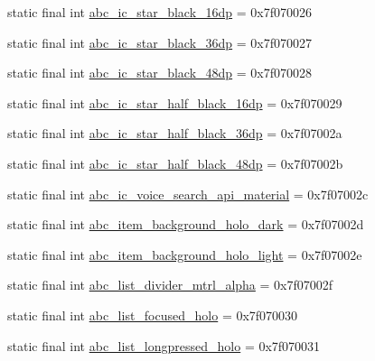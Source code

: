 \begin{DoxyCompactItemize}
\item 
static final int \mbox{\hyperlink{classandroid_1_1support_1_1design_1_1_r_1_1drawable_a1349833a92af4cf33ba5ba40922424cd}{abc\+\_\+ic\+\_\+star\+\_\+black\+\_\+16dp}} = 0x7f070026
\item 
static final int \mbox{\hyperlink{classandroid_1_1support_1_1design_1_1_r_1_1drawable_a53c64840aafc7cb905a77e8ae43146fa}{abc\+\_\+ic\+\_\+star\+\_\+black\+\_\+36dp}} = 0x7f070027
\item 
static final int \mbox{\hyperlink{classandroid_1_1support_1_1design_1_1_r_1_1drawable_ad675e83333ff2144c1caf279418c8c36}{abc\+\_\+ic\+\_\+star\+\_\+black\+\_\+48dp}} = 0x7f070028
\item 
static final int \mbox{\hyperlink{classandroid_1_1support_1_1design_1_1_r_1_1drawable_a93bca0ef4c914b420f16b575f153cb9f}{abc\+\_\+ic\+\_\+star\+\_\+half\+\_\+black\+\_\+16dp}} = 0x7f070029
\item 
static final int \mbox{\hyperlink{classandroid_1_1support_1_1design_1_1_r_1_1drawable_a7d30855bcf34cff38d00c8dda284eef5}{abc\+\_\+ic\+\_\+star\+\_\+half\+\_\+black\+\_\+36dp}} = 0x7f07002a
\item 
static final int \mbox{\hyperlink{classandroid_1_1support_1_1design_1_1_r_1_1drawable_a3c43eadf8e065ab4783200e4657248d3}{abc\+\_\+ic\+\_\+star\+\_\+half\+\_\+black\+\_\+48dp}} = 0x7f07002b
\item 
static final int \mbox{\hyperlink{classandroid_1_1support_1_1design_1_1_r_1_1drawable_aa07112ae69ed5850fa0c44fa53e619f1}{abc\+\_\+ic\+\_\+voice\+\_\+search\+\_\+api\+\_\+material}} = 0x7f07002c
\item 
static final int \mbox{\hyperlink{classandroid_1_1support_1_1design_1_1_r_1_1drawable_a7b733f9057a2cff89be485f9cd6928d5}{abc\+\_\+item\+\_\+background\+\_\+holo\+\_\+dark}} = 0x7f07002d
\item 
static final int \mbox{\hyperlink{classandroid_1_1support_1_1design_1_1_r_1_1drawable_a43f7ea0b127c030b4e1a667243515c79}{abc\+\_\+item\+\_\+background\+\_\+holo\+\_\+light}} = 0x7f07002e
\item 
static final int \mbox{\hyperlink{classandroid_1_1support_1_1design_1_1_r_1_1drawable_abb445bd8a123081407a9b597f769ad61}{abc\+\_\+list\+\_\+divider\+\_\+mtrl\+\_\+alpha}} = 0x7f07002f
\item 
static final int \mbox{\hyperlink{classandroid_1_1support_1_1design_1_1_r_1_1drawable_a1d26c3d76e535036aa21aa917a88cb4e}{abc\+\_\+list\+\_\+focused\+\_\+holo}} = 0x7f070030
\item 
static final int \mbox{\hyperlink{classandroid_1_1support_1_1design_1_1_r_1_1drawable_aacb9ee6a5ba24e73df7340a9e8f73314}{abc\+\_\+list\+\_\+longpressed\+\_\+holo}} = 0x7f070031

\end{DoxyCompactItemize}
